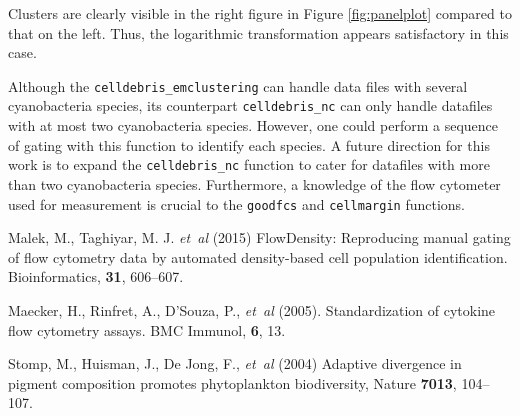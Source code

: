 \documentclass[9pt]{extarticle}
\begin{document}
Clusters are clearly visible in the right figure in Figure \ref{fig:panelplot} compared to that on the left. Thus, the logarithmic transformation appears satisfactory in this case. 

Although the \texttt{celldebris\_emclustering} can handle data files with several cyanobacteria species, its counterpart \texttt{celldebris\_nc} can only handle datafiles with at most two cyanobacteria species. However, one could perform a sequence of gating with this function to identify each species. A future direction for this work is to expand the \texttt{celldebris\_nc} function to cater for datafiles with more than two cyanobacteria species.  Furthermore, a knowledge of the flow cytometer used for measurement is crucial to the \texttt{goodfcs} and \texttt{cellmargin} functions.

\begin{thebibliography}{}
	
	Malek, M., Taghiyar, M. J. \textit{et~al} (2015) FlowDensity: Reproducing manual gating of flow cytometry data by automated density-based cell population identification. Bioinformatics, {\bf 31}, 606--607.
	
	 Maecker, H., Rinfret, A., D’Souza, P., \textit{et~al} (2005). Standardization of cytokine flow cytometry assays. BMC Immunol, {\bf 6}, 13.
	
	Stomp, M., Huisman, J., De Jong, F., \textit{et~al} (2004) Adaptive divergence in pigment composition promotes phytoplankton biodiversity, Nature {\bf 7013}, 104--107.
	
\end{thebibliography}
\end{document}
